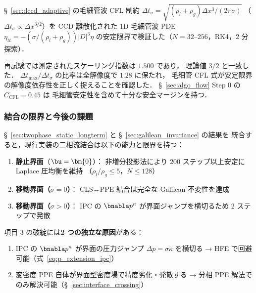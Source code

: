 §~\ref{sec:dccd_adaptive} の毛細管波 CFL 制約
$\Delta t_\sigma = \sqrt{(\rho_l + \rho_g)\Delta x^3 / (2\pi\sigma)}$
（$\Delta t_\sigma \propto \Delta x^{3/2}$）を
CCD 離散化された 1D 毛細管波 PDE
$\eta_{tt} = -(\sigma/(\rho_l{+}\rho_g))|D|^3\eta$
の安定限界で検証した（$N = 32$--$256$，RK4，2 分探索）．

再試験では測定されたスケーリング指数は $\mathbf{1.500}$ であり，
理論値 $3/2$ と一致した．
$\Delta t_{\max} / \Delta t_\sigma$ の比率は全解像度で $1.28$ に保たれ，
毛細管 CFL 式が安定限界の解像度依存性を正しく捉えることを確認した．
§~\ref{sec:algo_flow} Step 0 の $C_{\mathrm{CFL}} = 0.45$ は
毛細管安定性を含めて十分な安全マージンを持つ．

\subsubsection{結合の限界と今後の課題}
\label{sec:coupling_limitations}

§~\ref{sec:twophase_static_longterm} と §~\ref{sec:galilean_invariance} の結果を
統合すると，現行実装の二相流結合は以下の能力と限界を持つ：

\begin{enumerate}[noitemsep]
  \item \textbf{静止界面}（$\bu = \bm{0}$）：
        非増分投影法により 200 ステップ以上安定に Laplace 圧均衡を維持
        （$\rho_l/\rho_g \leq 5$，$N \leq 128$）
  \item \textbf{移動界面（$\sigma = 0$）}：
        CLS↔PPE 結合は完全な Galilean 不変性を達成
  \item \textbf{移動界面（$\sigma > 0$）}：
        IPC の $\bnabla p^n$ が界面ジャンプを横切るため 2 ステップで発散
\end{enumerate}

\noindent
項目 3 の破綻には\textbf{2 つの独立な原因}がある：
\begin{enumerate}[noitemsep]
  \item IPC の $\bnabla p^n$ が界面の圧力ジャンプ $\Delta p = \sigma\kappa$ を横切る
        → HFE で回避可能（式~\eqref{eq:p_extension_ipc}）
  \item 変密度 PPE 自体が界面型密度場で精度劣化・発散する
        → 分相 PPE 解法でのみ解決可能（§~\ref{sec:interface_crossing}）
\end{enumerate}

